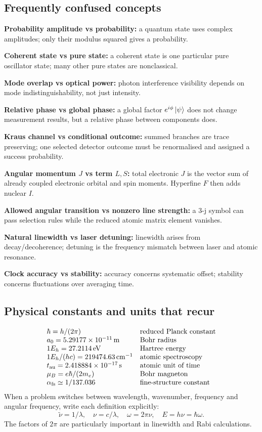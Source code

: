\subsection{Frequently confused concepts}
\textbf{Probability amplitude vs probability:}
a quantum state uses complex amplitudes;
only their modulus squared gives a probability.

\textbf{Coherent state vs pure state:}
a coherent state is one particular
pure oscillator state; many other
pure states are nonclassical.

\textbf{Mode overlap vs optical power:}
photon interference visibility depends
on mode indistinguishability, not just intensity.

\textbf{Relative phase vs global phase:}
a global factor \(e^{i\phi}\left\lvert \psi\right\rangle\)
does not change measurement results,
but a relative phase between components does.

\textbf{Kraus channel vs conditional outcome:}
summed branches are trace preserving;
one selected detector outcome must
be renormalised and assigned a success probability.

\textbf{Angular momentum \(J\) vs term \(L,S\):}
total electronic \(J\) is the vector sum
of already coupled electronic orbital and spin moments.
Hyperfine \(F\) then adds nuclear \(I\).

\textbf{Allowed angular transition vs nonzero line strength:}
a 3-j symbol can pass selection rules
while the reduced atomic matrix element vanishes.

\textbf{Natural linewidth vs laser detuning:}
linewidth arises from decay/decoherence;
detuning is the frequency mismatch
between laser and atomic resonance.

\textbf{Clock accuracy vs stability:}
accuracy concerns systematic offset;
stability concerns fluctuations over averaging time.

\subsection{Physical constants and units that recur}
\[
\begin{array}{@{}ll@{}}
\hbar=h/(2\pi)&\text{reduced Planck constant}\\
a_0=5.29177\times10^{-11}\,\mathrm m&
\text{Bohr radius}\\
1E_h=27.2114\,\mathrm{eV}&\text{Hartree energy}\\
1E_h/(hc)=219474.63\,\mathrm{cm}^{-1}&
\text{atomic spectroscopy}\\
t_{\rm au}=2.418884\times10^{-17}\,\mathrm s&
\text{atomic unit of time}\\
\mu_B=e\hbar/(2m_e)&\text{Bohr magneton}\\
\alpha_{\rm fs}\simeq1/137.036&
\text{fine-structure constant}
\end{array}
\]
When a problem switches between wavelength,
wavenumber, frequency and angular frequency,
write each definition explicitly:
\[
\tilde\nu=1/\lambda,\quad
\nu=c/\lambda,\quad
\omega=2\pi\nu,\quad E=h\nu=\hbar\omega.
\]
The factors of \(2\pi\) are particularly
important in linewidth and Rabi calculations.

